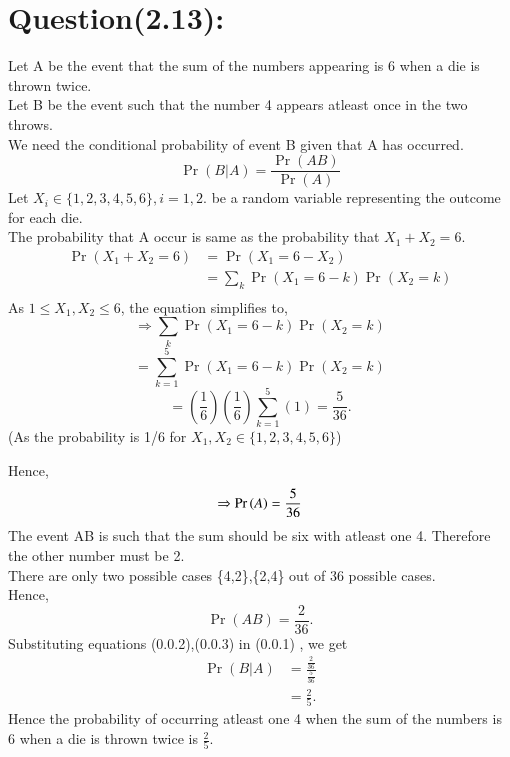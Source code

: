 \documentclass[journal,12pt,twocolumn]{IEEEtran}
\begin{document}
\section*{Question(2.13):}
Let A be the event that the sum of the numbers appearing is 6 when a die is thrown twice.\\
Let B be the event such that the number 4 appears atleast once in the two throws.\\
We need the conditional probability of event B given that A has occurred.\\ 
\begin{equation}
    \Pr{(B|A)}=\frac{\Pr{(AB)}}{\Pr{(A)}}
\end{equation}
Let $X_i \in \{1,2,3,4,5,6\},i = 1,2.$ be a random variable representing the outcome for each die.\\
The probability that A occur is same as the probability that $X_1 +X_2 =6$.\\
\begin{equation*}
\begin{split}
    \Pr{(X_1+X_2=6)}&=\Pr{(X_1=6-X_2)}\\
    &=\sum_{k}\Pr{(X_1=6-k)}\Pr{(X_2=k)}\\
\end{split}
\end{equation*}
As $1\leq X_1,X_2 \leq 6$, the equation simplifies to,\\
\begin{equation*}
        \Rightarrow \sum_{k}\Pr{(X_1=6-k)}\Pr{(X_2=k)} 
\end{equation*}
\begin{equation*}
    =\sum_{k=1}^{5}\Pr{(X_1=6-k)}\Pr{(X_2=k)}
\end{equation*}
\begin{equation*}
    =(\frac{1}{6})(\frac{1}{6})\sum_{k=1}^{5} (1)=\frac{5}{36}.
\end{equation*}
(As the probability is 1/6 for $X_1,X_2 \in \{1,2,3,4,5,6\}$)

Hence,\\
\begin{equation}
  \Rightarrow  \Pr{(A)}=\frac{5}{36}\\
\end{equation}
The event AB is such that the sum should be six with atleast one 4.
Therefore the other number must be 2.\\
There are only two possible cases \{4,2\},\{2,4\} out of 36 possible cases.\\
Hence,\\
\begin{equation}
    \Pr{(AB)}=\frac{2}{36}.    
\end{equation}
Substituting equations (0.0.2),(0.0.3) in (0.0.1) , we get\\
\begin{equation}
\begin{split}
\Pr(B|A)&=\frac{\frac{2}{36}}{\frac{5}{36}}\\
&=\frac{2}{5}.
\end{split}
\end{equation}
Hence the probability of occurring atleast one 4 when the sum of the numbers is 6 when a die is thrown twice is $\frac{2}{5}$. 
\end{document}
